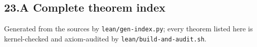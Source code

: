 \documentclass[
]{article}
\begin{document}
\subsection{23.A Complete theorem index}\label{a-complete-theorem-index}

Generated from the sources by
\texttt{l\allowbreak{}e\allowbreak{}a\allowbreak{}n\allowbreak{}/\allowbreak{}g\allowbreak{}e\allowbreak{}n\allowbreak{}-\allowbreak{}i\allowbreak{}n\allowbreak{}d\allowbreak{}e\allowbreak{}x\allowbreak{}.\allowbreak{}p\allowbreak{}y};
every theorem listed here is kernel-checked and axiom-audited by
\texttt{l\allowbreak{}e\allowbreak{}a\allowbreak{}n\allowbreak{}/\allowbreak{}b\allowbreak{}u\allowbreak{}i\allowbreak{}l\allowbreak{}d\allowbreak{}-\allowbreak{}a\allowbreak{}n\allowbreak{}d\allowbreak{}-\allowbreak{}a\allowbreak{}u\allowbreak{}d\allowbreak{}i\allowbreak{}t\allowbreak{}.\allowbreak{}s\allowbreak{}h}.
\end{document}
